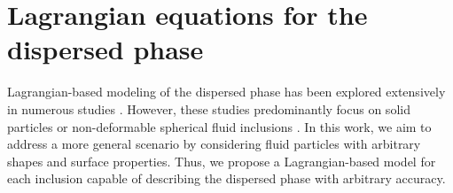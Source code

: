 \section{Lagrangian equations for the dispersed phase}
\label{sec:Lagrangian}

Lagrangian-based modeling of the dispersed phase has been explored extensively in numerous studies \citep{buyevich1979flow, lhuillier1992volume, simonin1996, zhang1994averaged, zhang1994ensemble, zhang1997momentum, jackson1997locally, zaepffel2011modelisation}. 
However, these studies predominantly focus on solid particles \citep{buyevich1979flow, lhuillier1992volume, simonin1996, zhang1994averaged, jackson1997locally} or non-deformable spherical fluid inclusions \citep{zhang1994ensemble, zaepffel2011modelisation}. 
In this work, we aim to address a more general scenario by considering fluid particles with arbitrary shapes and surface properties. Thus, we propose a Lagrangian-based model for each inclusion capable of describing the dispersed phase with arbitrary accuracy. %

